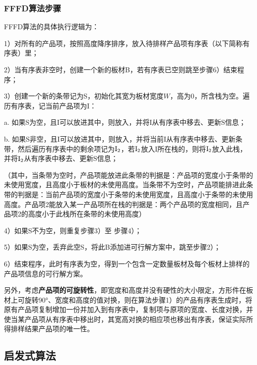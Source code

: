 \documentclass[bwprint]{gmcmthesis}
\begin{document}
	
	\subsubsection{FFFD算法步骤}	
	
	FFFD算法的具体执行逻辑为：
	
	1）对所有的产品项，按照高度降序排序，放入待排样产品项有序表（以下简称有序表）里；
	
	2）当有序表非空时，创建一个新的板材B，若有序表已空则跳至步骤6）结束程序；
	
	3）创建一个新的条带记为S，初始化其宽为板材宽度$W$，高为0，所含栈为空。遍历有序表，记当前产品项为I：
	
	a. 如果S为空，且I可以放进其中，则放入，并将I从有序表中移去、更新S信息；
	
	b. 如果S非空，且I可以放进其中，则放入，并将当前I从有序表中移去、更新条带，然后遍历有序表中的剩余项记为$\rm{I}_2$，若$\rm{I}_2$放入I所在栈的，则将$\rm{I}_2$放入此栈，并将$\rm{I}_2$从有序表中移去、更新S信息；
	
	（其中，当条带为空时，产品项能放进此条带的判据是：产品项的宽度小于条带的未使用宽度，且高度小于板材的未使用高度。当条带不为空时，产品项能排进此条带的判据是：当前产品项的宽度小于条带的未使用宽度，且高度小于条带的未使用高度。产品项2能放入某一产品项所在栈的判据是：两个产品项的宽度相同，且产品项2的高度小于此栈所在条带的未使用高度）
	
	4）如果S不为空，则重复步骤3）至 步骤4）；
	
	5）如果S为空，丢弃此空S，将此B添加进可行解方案中，跳至步骤2）；
	
	6）结束程序，此时有序表为空，得到一个包含一定数量板材及每个板材上排样的产品项信息的可行解方案。

	另外，考虑\textbf{产品项的可旋转性}，即宽度和高度并没有硬性的大小限定，方形件在板材上可旋转90°、宽度和高度的值对换，则在算法步骤1）的产品有序表生成时，将原有产品项复制增加一份并加入到有序表中，复制项与原项的宽度、长度对换，并使当某产品项从有序表中移出时，其宽高对换的相应项也移出有序表，保证实际所得排样结果产品项的唯一性。

\subsection{启发式算法}	
\end{document}
